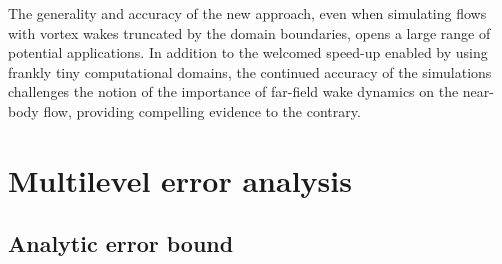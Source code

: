 \documentclass[final,1p,times]{elsarticle}
\begin{document}
The generality and accuracy of the new approach, even when simulating flows with vortex wakes truncated by the domain boundaries, opens a large range of potential applications. In addition to the welcomed speed-up enabled by using frankly tiny computational domains, the continued accuracy of the simulations challenges the notion of the importance of far-field wake dynamics on the near-body flow, providing compelling evidence to the contrary.



\appendix

\section{Multilevel error analysis}\label{A0}

\subsection{Analytic error bound}
\end{document}
